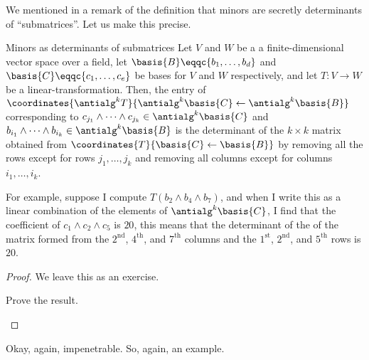We mentioned in a remark of the definition that minors are secretly determinants of ``submatrices''.  Let us make this precise.
\begin{thm}{Minors as determinants of submatrices}{}
	Let $V$ and $W$ be a a finite-dimensional vector space over a field, let $\basis{B}\eqqc \{ b_1,\ldots ,b_d\}$ and $\basis{C}\eqqc \{ c_1,\ldots ,c_e\}$ be bases for $V$ and $W$ respectively, and let $T\colon V\rightarrow W$ be a linear-transformation.  Then, the entry of $\coordinates{\antialg ^kT}{\antialg ^k\basis{C}\leftarrow \antialg ^k\basis{B}}$ corresponding to $c_{j_1}\wedge \cdots \wedge c_{j_k}\in \antialg ^k\basis{C}$ and $b_{i_1}\wedge \cdots \wedge b_{i_k}\in \antialg ^k\basis{B}$ is the determinant of the $k\times k$ matrix obtained from $\coordinates{T}{\basis{C}\leftarrow \basis{B}}$ by removing all the rows except for rows $j_1,\ldots ,j_k$ and removing all columns except for columns $i_1,\ldots ,i_k$.
	\begin{rmk}
		For example, suppose I compute $T(b_2\wedge b_4\wedge b_7)$, and when I write this as a linear combination of the elements of $\antialg ^k\basis{C}$, I find that the coefficient of $c_1\wedge c_2\wedge c_5$ is $20$, this means that the determinant of the of the matrix formed from the $2^{\text{nd}}$, $4^{\text{th}}$, and $7^{\text{th}}$ columns and the $1^{\text{st}}$, $2^{\text{nd}}$, and $5^{\text{th}}$ rows is $20$.
	\end{rmk}
	\begin{proof}
		We leave this as an exercise.
		\begin{exr}[breakable=false]{}{}
			Prove the result.
		\end{exr}
	\end{proof}
\end{thm}
Okay, again, impenetrable.  So, again, an example.
